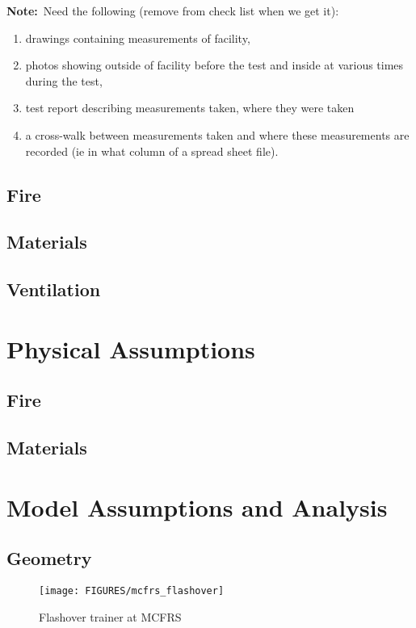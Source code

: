 \documentclass[11pt]{book}
\newcommand{\note}{{\bf Note:}}
\begin{document}
\note\ Need the following (remove from check list when we get it):
\begin{enumerate}
\item drawings containing measurements of facility,
\item photos showing outside of facility before the test and inside at various times during the test,
\item test report describing
measurements taken, where they were taken
\item a cross-walk between measurements taken and where these measurements are recorded (ie
in what column of a spread sheet file).
\end{enumerate}

\subsection{Fire}

\subsection{Materials}

\subsection{Ventilation}

\section{Physical Assumptions}
\subsection{Fire}

\subsection{Materials}

\section{Model Assumptions and Analysis}
\subsection{Geometry}
\begin{figure}[\figoptions]
\begin{center}
\texttt{[image: FIGURES/mcfrs\_flashover]}
\end{center}
\caption {Flashover trainer at MCFRS}
\label{figflashoversmoke}%
\end{figure}
\end{document}
